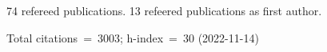 74 refereed publications. 13 refeered publications as first author.

Total citations~=~3003; h-index~=~30 (2022-11-14)